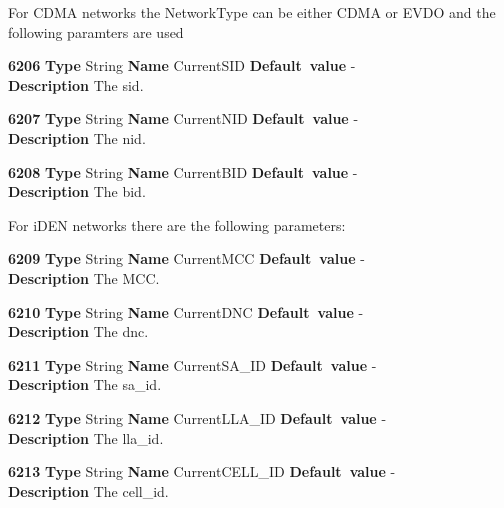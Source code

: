 \documentclass[a4paper]{article}
\begin{document}
For CDMA networks the NetworkType can be either CDMA or EVDO and
the following paramters are used
\begin{list}{\textbf{ParamID}}{}
\item \textbf{6206} \textbf{Type} String \textbf{Name} CurrentSID
                 \textbf{Default~value} - \\
  \textbf{Description} The sid.
\item \textbf{6207} \textbf{Type} String \textbf{Name} CurrentNID
                 \textbf{Default~value} - \\
  \textbf{Description} The nid.
\item \textbf{6208} \textbf{Type} String \textbf{Name} CurrentBID
                 \textbf{Default~value} - \\
  \textbf{Description} The bid.
\end{list}

For iDEN networks there are the following parameters:
\begin{list}{\textbf{ParamID}}{}
\item \textbf{6209} \textbf{Type} String \textbf{Name} CurrentMCC
                 \textbf{Default~value} - \\
  \textbf{Description} The MCC.
\item \textbf{6210} \textbf{Type} String \textbf{Name} CurrentDNC
                 \textbf{Default~value} - \\
  \textbf{Description} The dnc.
\item \textbf{6211} \textbf{Type} String \textbf{Name} CurrentSA\_ID
                 \textbf{Default~value} - \\
  \textbf{Description} The sa\_id.
\item \textbf{6212} \textbf{Type} String \textbf{Name} CurrentLLA\_ID
                 \textbf{Default~value} - \\
  \textbf{Description} The lla\_id.
\item \textbf{6213} \textbf{Type} String \textbf{Name} CurrentCELL\_ID
                 \textbf{Default~value} - \\
  \textbf{Description} The cell\_id.
\end{list}
\end{document}
